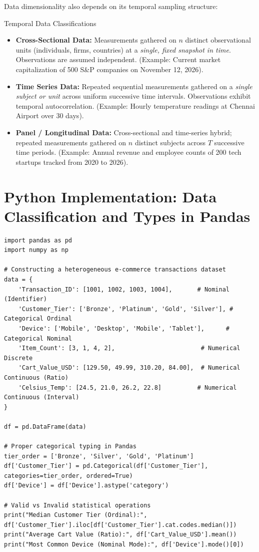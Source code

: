 Data dimensionality also depends on its temporal sampling structure:

\begin{definitionbox}{Temporal Data Classifications}
\begin{itemize}
    \item \textbf{Cross-Sectional Data:} Measurements gathered on $n$ distinct observational units (individuals, firms, countries) at a \emph{single, fixed snapshot in time}. Observations are assumed independent. (Example: Current market capitalization of 500 S\&P companies on November 12, 2026).
    \item \textbf{Time Series Data:} Repeated sequential measurements gathered on a \emph{single subject or unit} across uniform successive time intervals. Observations exhibit temporal autocorrelation. (Example: Hourly temperature readings at Chennai Airport over 30 days).
    \item \textbf{Panel / Longitudinal Data:} Cross-sectional and time-series hybrid; repeated measurements gathered on $n$ distinct subjects across $T$ successive time periods. (Example: Annual revenue and employee counts of 200 tech startups tracked from 2020 to 2026).
\end{itemize}
\end{definitionbox}

\section{Python Implementation: Data Classification and Types in Pandas}

\begin{lstlisting}[caption={Classifying and Inspecting Data Scales in Python/Pandas}]
import pandas as pd
import numpy as np

# Constructing a heterogeneous e-commerce transactions dataset
data = {
    'Transaction_ID': [1001, 1002, 1003, 1004],       # Nominal (Identifier)
    'Customer_Tier': ['Bronze', 'Platinum', 'Gold', 'Silver'], # Categorical Ordinal
    'Device': ['Mobile', 'Desktop', 'Mobile', 'Tablet'],      # Categorical Nominal
    'Item_Count': [3, 1, 4, 2],                        # Numerical Discrete
    'Cart_Value_USD': [129.50, 49.99, 310.20, 84.00],  # Numerical Continuous (Ratio)
    'Celsius_Temp': [24.5, 21.0, 26.2, 22.8]          # Numerical Continuous (Interval)
}

df = pd.DataFrame(data)

# Proper categorical typing in Pandas
tier_order = ['Bronze', 'Silver', 'Gold', 'Platinum']
df['Customer_Tier'] = pd.Categorical(df['Customer_Tier'], categories=tier_order, ordered=True)
df['Device'] = df['Device'].astype('category')

# Valid vs Invalid statistical operations
print("Median Customer Tier (Ordinal):", df['Customer_Tier'].iloc[df['Customer_Tier'].cat.codes.median()])
print("Average Cart Value (Ratio):", df['Cart_Value_USD'].mean())
print("Most Common Device (Nominal Mode):", df['Device'].mode()[0])
\end{lstlisting}

